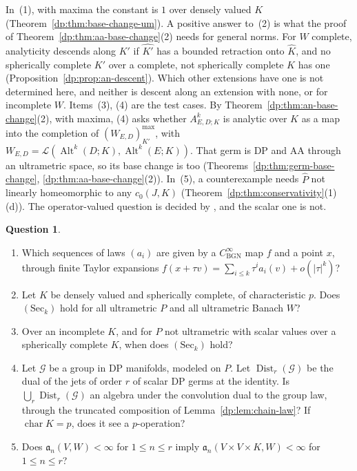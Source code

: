\documentclass[11pt]{amsart}
\theoremstyle{definition}
\theoremstyle{remark}
\numberwithin{equation}{section}
\newcommand{\cL}{\mathcal L}
\newcommand{\Alt}{\operatorname{Alt}}
\newcommand{\abs}[1]{\lvert #1\rvert}
\newcommand{\Kh}{\widehat K}
\theoremstyle{plain}
\theoremstyle{definition}
\newtheorem{question}[theorem]{Question}
\theoremstyle{plain}
\newcommand{\cG}{\mathcal G}
\begin{document}
In~(1), with maxima the constant is $1$ over densely valued $K$ (Theorem~\ref{dp:thm:base-change-um}). A positive answer to~(2) is what the proof of Theorem~\ref{dp:thm:aa-base-change}(2) needs for general norms. For $W$ complete, analyticity descends along $K'$ if $\widehat{K'}$ has a bounded retraction onto $\Kh$, and no spherically complete $K'$ over a complete, not spherically complete $K$ has one (Proposition~\ref{dp:prop:an-descent}). Which other extensions have one is not determined here, and neither is descent along an extension with none, or for incomplete $W$. Items~(3), (4) are the test cases. By Theorem~\ref{dp:thm:an-base-change}(2), with maxima, (4) asks whether $A^k_{E,D;K}$ is analytic over $K$ as a map into the completion of $(W_{E,D})^{\max}_{K'}$, with $W_{E,D}=\cL(\Alt^k(D;K),\Alt^k(E;K))$. That germ is DP and AA through an ultrametric space, so its base change is too (Theorems~\ref{dp:thm:germ-base-change}, \ref{dp:thm:aa-base-change}(2)). In~(5), a counterexample needs $\widehat P$ not linearly homeomorphic to any $c_0(J,K)$ (Theorem~\ref{dp:thm:conservativity}(1)(d)). The operator-valued question is decided by \cite[Theorem~7.2(2)]{I}, and the scalar one is not.

\begin{question}\label{dp:q:jets}
\leavevmode
\begin{enumerate}
\item Which sequences of laws $(a_i)$ are given by a $C^\infty_{\mathrm{BGN}}$ map $f$ and a point $x$, through finite Taylor expansions $f(x+\tau v)=\sum_{i\le k}\tau^ia_i(v)+o(\abs\tau^k)$?
\item Let $K$ be densely valued and spherically complete, of characteristic $p$. Does $(\mathrm{Sec}_k)$ hold for all ultrametric $P$ and all ultrametric Banach $W$?
\item Over an incomplete $K$, and for $P$ not ultrametric with scalar values over a spherically complete $K$, when does $(\mathrm{Sec}_k)$ hold?
\item Let $\cG$ be a group in DP manifolds, modeled on $P$. Let $\operatorname{Dist}_r(\cG)$ be the dual of the jets of order $r$ of scalar DP germs at the identity. Is $\bigcup_r\operatorname{Dist}_r(\cG)$ an algebra under the convolution dual to the group law, through the truncated composition of Lemma~\ref{dp:lem:chain-law}? If $\operatorname{char}K=p$, does it see a $p$\nobreakdash-operation?
\item Does $\mathfrak a_n(V,W)<\infty$ for $1\le n\le r$ imply $\mathfrak a_n(V\times V\times K,W)<\infty$ for $1\le n\le r$?
\end{enumerate}
\end{question}
\end{document}
